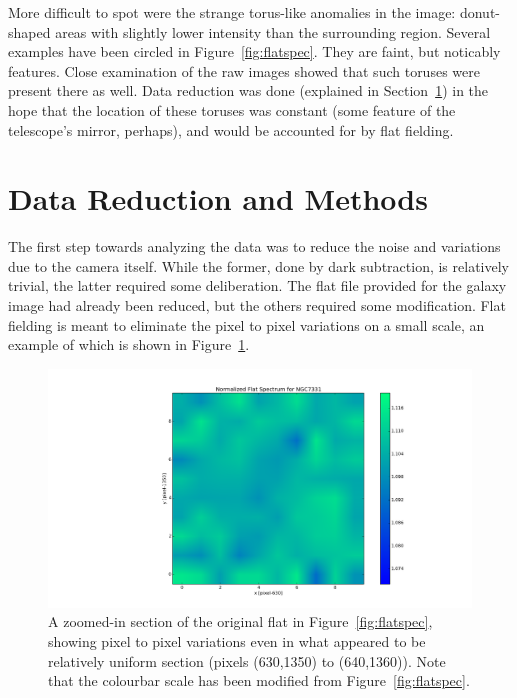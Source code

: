 \documentclass[a4paper,12pt]{article}
\begin{document}
More difficult to spot were the strange torus-like anomalies in the image: donut-shaped areas with slightly lower intensity than the surrounding region. Several examples have been circled in Figure~\ref{fig:flatspec}. They are faint, but noticably features. Close examination of the raw images showed that such toruses were present there as well. Data reduction was done (explained in Section~\ref{sec:data}) in the hope that the location of these toruses was constant (some feature of the telescope's mirror, perhaps), and would be accounted for by flat fielding.


\section{Data Reduction and Methods}
\label{sec:data}

The first step towards analyzing the data was to reduce the noise and variations due to the camera itself. While the former, done by dark subtraction, is relatively trivial, the latter required some deliberation. The flat file provided for the galaxy image had already been reduced, but the others required some modification. Flat fielding is meant to eliminate the pixel to pixel variations on a small scale, an example of which is shown in Figure~\ref{fig:flatzoom}.

\begin{figure}[!htbp]
  \centering
  \includegraphics[width=\linewidth]{zoomflatspectrum.png}
  \caption{A zoomed-in section of the original flat in Figure~\ref{fig:flatspec}, showing pixel to pixel variations even in what appeared to be relatively uniform section (pixels (630,1350) to (640,1360)). Note that the colourbar scale has been modified from Figure~\ref{fig:flatspec}.}
  \label{fig:flatzoom}
\end{figure}
\end{document}
